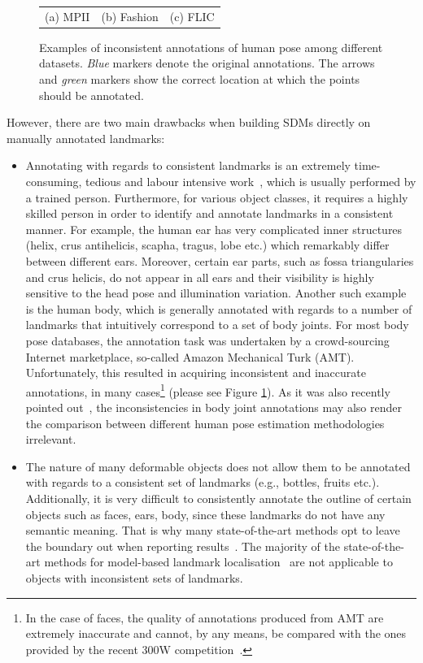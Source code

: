 \begin{figure}
\begin{tabular}{ccc}
    \\
    (a) MPII
    &
    (b) Fashion
    &
    (c) FLIC
    \end{tabular}
\caption{Examples of inconsistent annotations of human pose among different datasets. \emph{Blue} markers denote the original annotations. The arrows and \emph{green} markers show the correct location at which the points should be annotated.}
\label{fig:wrong_anno}
\end{figure} 

However, there are two main drawbacks when building SDMs directly on manually annotated landmarks:
\begin{itemize}

\item Annotating with regards to consistent landmarks is an extremely time-consuming, tedious and labour intensive work~\cite{sagonas_iccv_300w_2013}, which is usually performed by a trained person. Furthermore, for various object classes, it requires a highly skilled person in order to identify and annotate landmarks in a consistent manner. For example, the human ear has very complicated inner structures (helix, crus antihelicis, scapha, tragus, lobe etc.) which remarkably differ between different ears. Moreover, certain ear parts, such as fossa triangularies and crus helicis, do not appear in all ears and their visibility is highly sensitive to the head pose and illumination variation. Another such example is the human body, which is generally annotated with regards to a number of landmarks that intuitively correspond to a set of body joints. For most body pose databases, the annotation task was undertaken by a crowd-sourcing Internet marketplace, so-called Amazon Mechanical Turk (AMT). Unfortunately, this resulted in acquiring inconsistent and inaccurate annotations, in many cases\footnote{In the case of faces, the quality of annotations produced from AMT are extremely inaccurate and cannot, by any means, be compared with the ones provided by the recent 300W competition~\cite{sagonas_iccv_300w_2013,sagonas2016faces}.} (please see Figure \ref{fig:wrong_anno}). As it was also recently pointed out~\cite{tompson2015efficient}, the inconsistencies in body joint annotations may also render the comparison between different human pose estimation methodologies irrelevant.

\item The nature of many deformable objects does not allow them to be annotated with regards to a consistent set of landmarks (e.g., bottles, fruits etc.). Additionally, it is very difficult to consistently annotate the outline of certain objects such as faces, ears, body, since these landmarks do not have any semantic meaning. That is why many state-of-the-art methods opt to leave the boundary out when reporting results~\cite{Tzimiropoulos2014, Asthana2014}. The majority of the state-of-the-art methods for model-based landmark localisation~\cite{Cao2012, Zhu2012, Xiong2013, Tzimiropoulos2014, Asthana2014} are not applicable to objects with inconsistent sets of landmarks.

\end{itemize}

